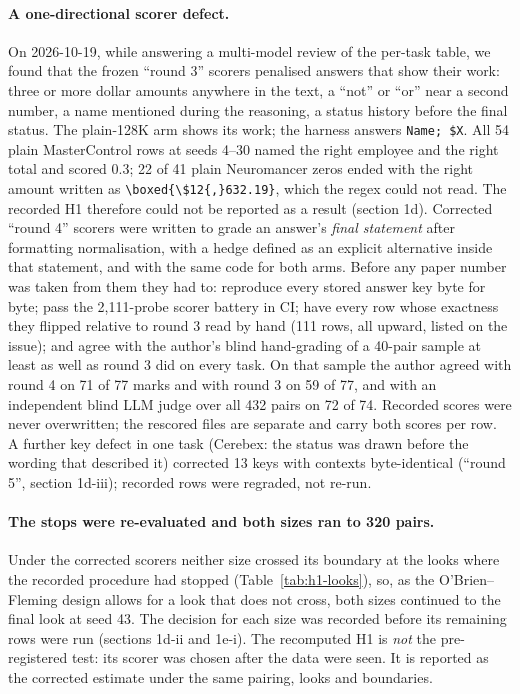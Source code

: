\documentclass[11pt]{article}
\newcommand{\code}[1]{\texttt{#1}}
\begin{document}
\paragraph{A one-directional scorer defect.} On 2026-10-19, while answering a
multi-model review of the per-task table, we found that the frozen ``round 3'' scorers
penalised answers that show their work: three or more dollar amounts anywhere in the
text, a ``not'' or ``or'' near a second number, a name mentioned during the reasoning,
a status history before the final status. The plain-128K arm shows its work; the
harness answers \code{Name; \$X}. All 54 plain MasterControl rows at seeds 4--30 named
the right employee and the right total and scored 0.3; 22 of 41 plain Neuromancer zeros
ended with the right amount written as \verb|\boxed{\$12{,}632.19}|, which the regex
could not read. The recorded H1 therefore could not be reported as a result (section
1d). Corrected ``round 4'' scorers were written to grade an answer's \emph{final
statement} after formatting normalisation, with a hedge defined as an explicit
alternative inside that statement, and with the same code for both arms. Before any
paper number was taken from them they had to: reproduce every stored answer key byte
for byte; pass the 2,111-probe scorer battery in CI; have every row whose exactness they
flipped relative to round 3 read by hand (111 rows, all upward, listed on the issue);
and agree with the author's blind hand-grading of a 40-pair sample at least as well as
round 3 did on every task. On that sample the author agreed with round 4 on 71 of 77
marks and with round 3 on 59 of 77, and with an independent blind LLM judge over all 432
pairs on 72 of 74. Recorded scores were never overwritten; the rescored files are
separate and carry both scores per row. A further key defect in one task (Cerebex: the
status was drawn before the wording that described it) corrected 13 keys with contexts
byte-identical (``round 5'', section 1d-iii); recorded rows were regraded, not re-run.

\paragraph{The stops were re-evaluated and both sizes ran to 320 pairs.} Under the
corrected scorers neither size crossed its boundary at the looks where the recorded
procedure had stopped (Table~\ref{tab:h1-looks}), so, as the O'Brien--Fleming design
allows for a look that does not cross, both sizes continued to the final look at seed
43. The decision for each size was recorded before its remaining rows were run (sections
1d-ii and 1e-i). The recomputed H1 is \emph{not} the pre-registered test: its scorer was
chosen after the data were seen. It is reported as the corrected estimate under the same
pairing, looks and boundaries.
\end{document}
